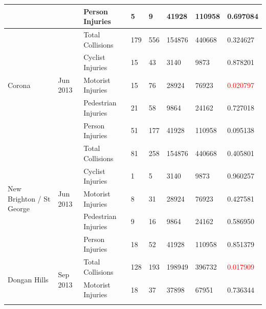 \documentclass[10pt,journal,compsoc]{IEEEtran}
\begin{document}
\begin{table}[]
\begin{tabular}{|l|l|l|l|l|l|l|l|}
                                               &                             & Person Injuries     & 5         & 9        & 41928      & 110958    & 0.697084 \\ \hline
\multirow{5}{*}{Corona}                        & \multirow{5}{*}{Jun 2013} & Total Collisions    & 179       & 556      & 154876     & 440668    & 0.324627 \\ \cline{3-8} 
                                               &                             & Cyclist Injuries    & 15        & 43       & 3140       & 9873      & 0.878201 \\ \cline{3-8} 
                                               &                             & Motorist Injuries   & 15        & 76       & 28924      & 76923     & \textcolor{red}{0.020797} \\ \cline{3-8} 
                                               &                             & Pedestrian Injuries & 21        & 58       & 9864       & 24162     & 0.727018 \\ \cline{3-8} 
                                               &                             & Person Injuries     & 51        & 177      & 41928      & 110958    & 0.095138 \\ \hline
\multirow{5}{*}{New Brighton / St George}      & \multirow{5}{*}{Jun 2013} & Total Collisions    & 81        & 258      & 154876     & 440668    & 0.405801 \\ \cline{3-8} 
                                               &                             & Cyclist Injuries    & 1         & 5        & 3140       & 9873      & 0.960257 \\ \cline{3-8} 
                                               &                             & Motorist Injuries   & 8         & 31       & 28924      & 76923     & 0.427581 \\ \cline{3-8} 
                                               &                             & Pedestrian Injuries & 9         & 16       & 9864       & 24162     & 0.586950 \\ \cline{3-8} 
                                               &                             & Person Injuries     & 18        & 52       & 41928      & 110958    & 0.851379 \\ \hline
\multirow{4}{*}{Dongan Hills}                  & \multirow{4}{*}{Sep 2013} & Total Collisions    & 128       & 193      & 198949     & 396732    & \textcolor{red}{0.017909} \\ \cline{3-8} 
                                               &                             & Motorist Injuries   & 18        & 37       & 37898      & 67951     & 0.736344 \\ \cline{3-8} 

\end{tabular}
\end{table}
\end{document}
